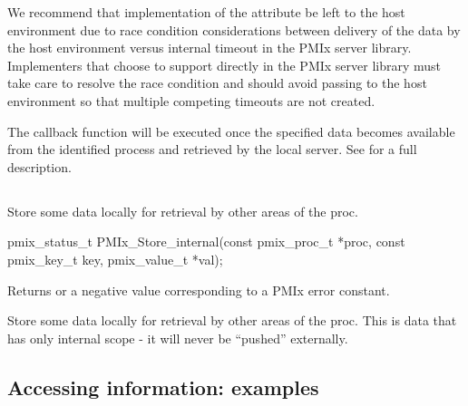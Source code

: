 
\optattrend

\adviceimplstart
We recommend that implementation of the  attribute be left to the host environment due to race condition considerations between delivery of the data by the host environment versus internal timeout in the \ac{PMIx} server library. Implementers that choose to support  directly in the \ac{PMIx} server library must take care to resolve the race condition and should avoid passing  to the host environment so that multiple competing timeouts are not created.
\adviceimplend

\descr

The callback function will be executed once the specified data becomes available from the identified process and retrieved by the local server.
See  for a full description.


\subsection{}

\summary

Store some data locally for retrieval by other areas of the proc.

\format

\cspecificstart
\begin{codepar}
pmix_status_t
PMIx_Store_internal(const pmix_proc_t *proc,
                    const pmix_key_t key,
                    pmix_value_t *val);
\end{codepar}
\cspecificend

\begin{arglist}
\end{arglist}

Returns  or a negative value corresponding to a PMIx error constant.

\descr

Store some data locally for retrieval by other areas of the proc.
This is data that has only internal scope - it will never be ``pushed'' externally.

\subsection{Accessing information: examples}
\label{chap:api_kv:getex}


